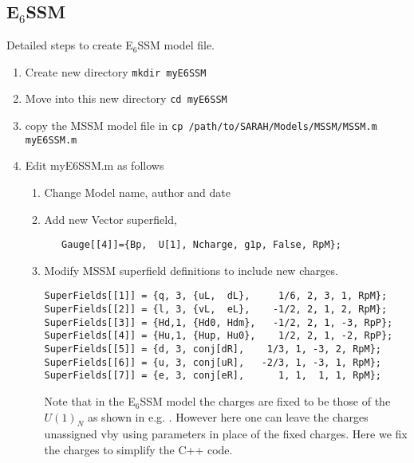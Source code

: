 \documentclass[final,3p,11pt,pdflatex]{elsarticle}
\newcommand{\ESSM}{E$_6$SSM\xspace}
\newcommand{\code}[1]{\lstinline|#1|}  %
\begin{document}
\subsection{\ESSM}
Detailed steps to create \ESSM model file.
\begin{enumerate}
\item Create new directory \code{mkdir myE6SSM}
\item Move into this new directory \code{cd myE6SSM}
\item copy the MSSM model file in \code{cp /path/to/SARAH/Models/MSSM/MSSM.m  myE6SSM.m}
\item Edit myE6SSM.m as follows
\begin{enumerate}
\item  Change Model name, author and date
\item Add new Vector superfield,
 \begin{lstlisting} 
   Gauge[[4]]={Bp,  U[1], Ncharge, g1p, False, RpM};
 \end{lstlisting}
\item Modify MSSM superfield definitions to include new charges.
\begin{lstlisting}
SuperFields[[1]] = {q, 3, {uL,  dL},     1/6, 2, 3, 1, RpM};  
SuperFields[[2]] = {l, 3, {vL,  eL},    -1/2, 2, 1, 2, RpM};
SuperFields[[3]] = {Hd,1, {Hd0, Hdm},   -1/2, 2, 1, -3, RpP};
SuperFields[[4]] = {Hu,1, {Hup, Hu0},    1/2, 2, 1, -2, RpP};
SuperFields[[5]] = {d, 3, conj[dR],    1/3, 1, -3, 2, RpM};
SuperFields[[6]] = {u, 3, conj[uR],   -2/3, 1, -3, 1, RpM};
SuperFields[[7]] = {e, 3, conj[eR],      1, 1,  1, 1, RpM};
\end{lstlisting}
Note that in the \ESSM model the charges are fixed to be those of the $U(1)_N$ as shown in e.g. \cite{King:2005jy}.  However here one can leave the charges unassigned vby using parameters in place of the fixed charges.  Here we fix the charges to simplify the C++ code.


\end{enumerate}
\end{enumerate}
\end{document}
